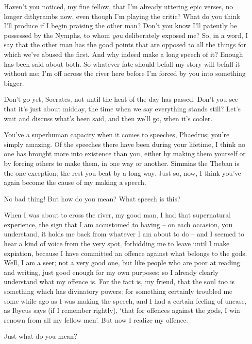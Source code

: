  Haven't you noticed, my fine fellow, that I'm already
uttering epic verses, no longer dithyrambs now, even though I'm playing
the critic? What do you
think I'll produce if I begin praising the other man? Don't you know
I'll patently be  possessed by the Nymphs, to whom {\em you}
deliberately exposed me? So, in a word, I say that the other man has the
good points that are opposed to all the things for which we've abused
the first. And why indeed make a long speech of it? Enough has been said
about both. So whatever fate should befall my story  will
befall it without me; I'm
off across the river here before I'm forced by you into something
bigger.

Don't go yet, Socrates, not until the heat of the day has
passed. Don't you see that it's just about midday, the
time when we say
everything stands still? Let's wait and discuss  what's been
said, and then we'll go, when it's cooler.

You've a superhuman
capacity when it comes to
speeches, Phaedrus; you're simply amazing. Of the speeches there have
been during your lifetime, I think no one has brought  more into
existence than you, either by making them yourself or by forcing others
to make them, in one way or another. Simmias the
Theban is the one
exception; the rest you beat by a long way. Just so, now, I think you've
again become the cause of my making a speech. 

No bad thing! But how do you mean? What speech is this?

When I was about to cross the river, my good man, I had that
supernatural experience, the
sign that I am accustomed
to having -- on each occasion, you understand, it  holds me back
from whatever I am about to do -- and I seemed to hear a kind of voice
from the very spot, forbidding me to leave until I make expiation,
because I have committed an offence against what belongs to the
gods. Well, I am a seer;
not a very good one, but like people who are poor at reading 
and writing, just good enough for my own purposes; so I already clearly
understand what my offence is. For the fact is, my friend, that the soul
too is something which has divinatory powers; for something certainly
troubled me some while ago as I was making the speech, and I had a
certain feeling of unease, as Ibycus says (if I remember rightly), ‘that
for offences against  the gods, I win renown from all my fellow
men'. But now I realize
my offence.

Just what do you mean?

